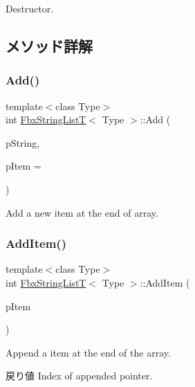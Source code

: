 Destructor. 



\subsection{メソッド詳解}
\mbox{\label{class_fbx_string_list_t_ace48eedb25e7393d546c914924355cd2}} 
\subsubsection{\texorpdfstring{Add()}{Add()}}
{\footnotesize\ttfamily template$<$class Type$>$ \\
int \hyperlink{class_fbx_string_list_t}{Fbx\+String\+ListT}$<$ Type $>$\+::Add (\begin{DoxyParamCaption}\item[{const char $\ast$}]{p\+String,  }\item[{Fbx\+Handle}]{p\+Item = {} }\end{DoxyParamCaption})}



Add a new item at the end of array. 

\mbox{\label{class_fbx_string_list_t_aa8dfd9f7ca27dafca1f2c80aa8590a19}} 
\subsubsection{\texorpdfstring{Add\+Item()}{AddItem()}}
{\footnotesize\ttfamily template$<$class Type$>$ \\
int \hyperlink{class_fbx_string_list_t}{Fbx\+String\+ListT}$<$ Type $>$\+::Add\+Item (\begin{DoxyParamCaption}\item[{Type $\ast$}]{p\+Item }\end{DoxyParamCaption})}

Append a item at the end of the array. \begin{DoxyReturn}{戻り値}
Index of appended pointer. 
\end{DoxyReturn}
\mbox{\label{class_fbx_string_list_t_ac5bcede97ed831d4fe76f3087a63398e}} 

